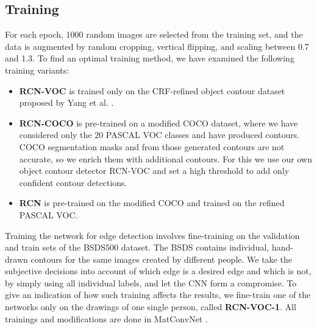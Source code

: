 \documentclass[runningheads]{llncs}
\begin{document}
\subsection{Training}
For each epoch, 1000 random images are selected from the training set, and the data is augmented by random cropping, vertical flipping, and scaling between 0.7 and 1.3. To find an optimal training method, we have examined the following training variants:
\begin{itemize}
\item \textbf{RCN-VOC} is trained only on the CRF-refined object contour dataset proposed by Yang et al. \cite{CEDN}.
\item \textbf{RCN-COCO} is pre-trained on a modified COCO dataset, where we have considered only the 20 PASCAL VOC classes and have produced contours. COCO segmentation masks and from those generated contours are not accurate, so we enrich them with additional contours. For this we use our own object contour detector RCN-VOC and set a high threshold to add only confident contour detections.
\item \textbf{RCN} is pre-trained on the modified COCO and trained on the refined PASCAL VOC.
\end{itemize}

Training the network for edge detection involves fine-training on the validation and train sets of the BSDS500 dataset. The BSDS contains individual, hand-drawn contours for the same images created by different people. We take the subjective decisions into account of which edge is a desired edge and which is not, by simply using all individual labels, and let the CNN form a compromise. To give an indication of how such training affects the results, we fine-train one of the networks only on the drawings of one single person, called \textbf{RCN-VOC-1}. All trainings and modifications are done in MatConvNet \cite{vedaldi15matconvnet}.
\end{document}
